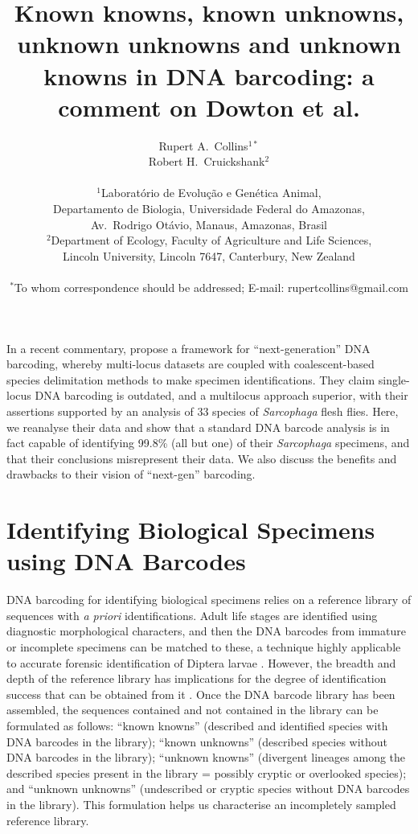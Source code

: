 \documentclass[12pt]{article}
\title{\bf Known knowns, known unknowns, unknown unknowns and unknown knowns in DNA barcoding: a comment on Dowton et al.}
\author
{Rupert A.\ Collins$^{1*}$\\
Robert H.\ Cruickshank$^{2}$\\
\\
\normalsize{$^{1}$Laborat\'orio de Evolu\c c\~ao e Gen\'etica Animal,}\\
\normalsize{Departamento de Biologia, Universidade Federal do Amazonas,}\\
\normalsize{Av.\ Rodrigo Ot\'avio, Manaus, Amazonas, Brasil}\\
\normalsize{$^{2}$Department of Ecology, Faculty of Agriculture and Life Sciences,}\\
\normalsize{Lincoln University,  Lincoln 7647,  Canterbury, New Zealand}\\
\\
\normalsize{$^\ast$To whom correspondence should be addressed; E-mail:  rupertcollins@gmail.com}
}
\date{}
\begin{document}
 
\maketitle 

In a recent commentary, \citet{Dowton2014} propose a framework for ``next-generation'' DNA barcoding, whereby multi-locus datasets are coupled with coalescent-based species delimitation methods to make specimen identifications. They claim single-locus DNA barcoding is outdated, and a multilocus approach superior, with their assertions supported by an analysis of 33 species of \emph{Sarcophaga} flesh flies. Here, we reanalyse their data and show that a standard DNA barcode analysis is in fact capable of identifying 99.8\% (all but one) of their \emph{Sarcophaga} specimens, and that their conclusions misrepresent their data. We also discuss the benefits and drawbacks to their vision of ``next-gen'' barcoding.


\section*{Identifying Biological Specimens using DNA Barcodes}

DNA barcoding for identifying biological specimens relies on a reference library of sequences with \emph{a priori} identifications. Adult life stages are identified using diagnostic morphological characters, and then the DNA barcodes from immature or incomplete specimens can be matched to these, a technique highly applicable to accurate forensic identification of Diptera larvae \citep{Meiklejohn2011}. However, the breadth and depth of the reference library has implications for the degree of identification success that can be obtained from it \citep{Bergsten2012,Virgilio2012,Zhang2012b}. Once the DNA barcode library has been assembled, the sequences contained and not contained in the library can be formulated as follows: ``known knowns'' (described and identified species with DNA barcodes in the library); ``known unknowns'' (described species without DNA barcodes in the library); ``unknown knowns'' (divergent lineages among the described species present in the library = possibly cryptic or overlooked species); and ``unknown unknowns'' (undescribed or cryptic species without DNA barcodes in the library). This formulation helps us characterise an incompletely sampled reference library.
\end{document}

